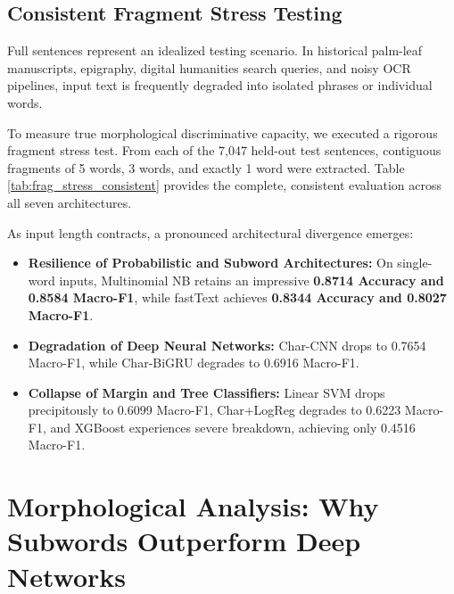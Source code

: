 \documentclass[11pt]{article}
\begin{document}
\subsection{Consistent Fragment Stress Testing}
Full sentences represent an idealized testing scenario. In historical palm-leaf manuscripts, epigraphy, digital humanities search queries, and noisy OCR pipelines, input text is frequently degraded into isolated phrases or individual words.

To measure true morphological discriminative capacity, we executed a rigorous fragment stress test. From each of the 7,047 held-out test sentences, contiguous fragments of 5 words, 3 words, and exactly 1 word were extracted. Table \ref{tab:frag_stress_consistent} provides the complete, consistent evaluation across all seven architectures.

As input length contracts, a pronounced architectural divergence emerges:
\begin{itemize}
    \item \textbf{Resilience of Probabilistic and Subword Architectures:} On single-word inputs, Multinomial NB retains an impressive \textbf{0.8714 Accuracy and 0.8584 Macro-F1}, while fastText achieves \textbf{0.8344 Accuracy and 0.8027 Macro-F1}.
    \item \textbf{Degradation of Deep Neural Networks:} Char-CNN drops to 0.7654 Macro-F1, while Char-BiGRU degrades to 0.6916 Macro-F1.
    \item \textbf{Collapse of Margin and Tree Classifiers:} Linear SVM drops precipitously to 0.6099 Macro-F1, Char+LogReg degrades to 0.6223 Macro-F1, and XGBoost experiences severe breakdown, achieving only 0.4516 Macro-F1.
\end{itemize}

\section{Morphological Analysis: Why Subwords Outperform Deep Networks}
\end{document}
